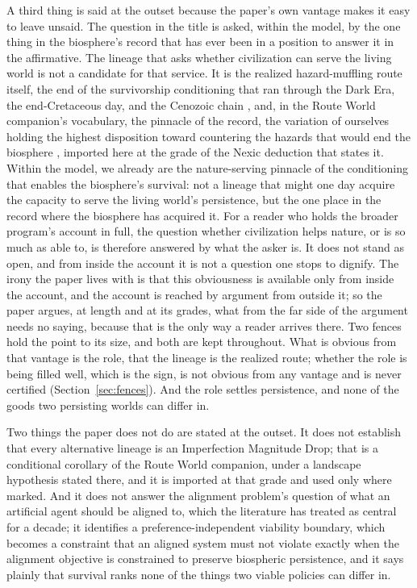 A third thing is said at the outset because the paper's own vantage makes
it easy to leave unsaid. The question in the title is asked, within the
model, by the one thing in the biosphere's record that has ever been in a
position to answer it in the affirmative. The lineage that asks whether
civilization can serve the living world is not a candidate for that
service. It is the realized hazard-muffling route itself, the end of the
survivorship conditioning that ran through the Dark Era, the
end-Cretaceous day, and the Cenozoic chain \cite{Nexus}, and, in the Route
World companion's vocabulary, the pinnacle of the record, the variation of
ourselves holding the highest disposition toward countering the hazards
that would end the biosphere \cite{GoldenRouteWorld}, imported here at the
grade of the Nexic deduction that states it. Within the model, we already
are the nature-serving pinnacle of the conditioning that enables the
biosphere's survival: not a lineage that might one day acquire the
capacity to serve the living world's persistence, but the one place in the
record where the biosphere has acquired it. For a reader who holds the
broader program's account in full, the question whether civilization helps
nature, or is so much as able to, is therefore answered by what the asker
is. It does not stand as open, and from inside the account it is not a
question one stops to dignify. The irony the paper lives with is that this
obviousness is available only from inside the account, and the account is
reached by argument from outside it; so the paper argues, at length and at
its grades, what from the far side of the argument needs no saying, because
that is the only way a reader arrives there. Two fences hold the point to
its size, and both are kept throughout. What is obvious from that vantage
is the role, that the lineage is the realized route; whether the role is
being filled well, which is the sign, is not obvious from any vantage and
is never certified (Section~\ref{sec:fences}). And the role settles
persistence, and none of the goods two persisting worlds can differ in.


Two things the paper does not do are stated at the outset. It does not
establish that every alternative lineage is an Imperfection Magnitude
Drop; that is a conditional corollary of the Route World companion,
under a landscape hypothesis stated there, and it is imported at that
grade and used only where marked. And it does not answer the alignment
problem's question of what an artificial agent should be aligned to,
which the literature has treated as central for a decade; it identifies a
preference-independent viability boundary, which becomes a constraint
that an aligned system must not violate exactly when the alignment
objective is constrained to preserve biospheric persistence, and it
says plainly that survival ranks none of the things two viable policies
can differ in.

